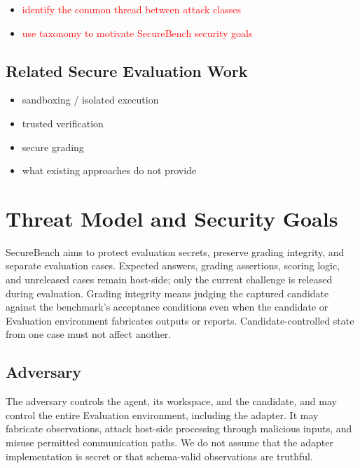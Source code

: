 \documentclass[conference]{IEEEtran}
\newcommand{\draft}[1]{%
    \par\noindent
    {\color{gray}\small #1}
    \par
}
\newcommand{\teacher}[1]{\textcolor{red}{#1}}
\begin{document}
\draft{
\begin{itemize}
    \item \teacher{identify the common thread between attack classes}
    \item \teacher{use taxonomy to motivate SecureBench security goals}
\end{itemize}
}

\subsection{Related Secure Evaluation Work}

\draft{
\begin{itemize}
    \item sandboxing / isolated execution
    \item trusted verification
    \item secure grading
    \item what existing approaches do not provide
\end{itemize}
}



\section{Threat Model and Security Goals}


SecureBench aims to protect evaluation secrets, preserve grading integrity, and separate evaluation cases. Expected answers, grading assertions, scoring logic, and unreleased cases remain host-side; only the current challenge is released during evaluation. Grading integrity means judging the captured candidate against the benchmark's acceptance conditions even when the candidate or Evaluation environment fabricates outputs or reports. Candidate-controlled state from one case must not affect another.


\subsection{Adversary}


The adversary controls the agent, its workspace, and the candidate, and may control the entire Evaluation environment, including the adapter. It may fabricate observations, attack host-side processing through malicious inputs, and misuse permitted communication paths. We do not assume that the adapter implementation is secret or that schema-valid observations are truthful.
\end{document}
